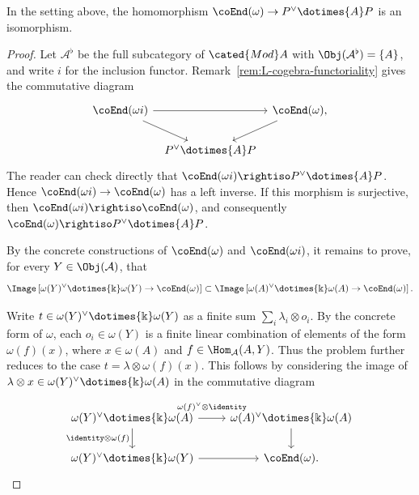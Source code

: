 \begin{proposition}\label{prop:endomorphism-vs-P}
	In the setting above, the homomorphism
	$\coEnd(\omega)\to P^\vee\dotimes{A}P$ is an isomorphism.
\end{proposition}
\begin{proof}
	Let $\mathcal{A}^\flat$ be the full subcategory of $\cated{Mod}A$ with
	$\Obj(\mathcal{A}^\flat)=\{A\}$, and write $i$ for the inclusion functor.
	Remark~\ref{rem:L-cogebra-functoriality} gives the commutative diagram
	\[\begin{tikzcd}[column sep=tiny]
		\coEnd(\omega i) \arrow[rr] \arrow[rd] & & \coEnd(\omega), \arrow[ld] \\
		& P^\vee \dotimes{A} P &
	\end{tikzcd}\]
	The reader can check directly that
	$\coEnd(\omega i)\rightiso P^\vee\dotimes{A}P$. Hence
	$\coEnd(\omega i)\to\coEnd(\omega)$ has a left inverse. If this morphism
	is surjective, then $\coEnd(\omega i)\rightiso\coEnd(\omega)$, and
	consequently $\coEnd(\omega)\rightiso P^\vee\dotimes{A}P$.

	By the concrete constructions of $\coEnd(\omega)$ and
	$\coEnd(\omega i)$, it remains to prove, for every
	$Y\in\Obj(\mathcal{A})$, that
	\[ \Image\left[ \omega(Y)^\vee \dotimes{\Bbbk} \omega(Y) \to \coEnd(\omega) \right] \subset \Image\left[ \omega(A)^\vee \dotimes{\Bbbk} \omega(A) \to \coEnd(\omega) \right]. \]

	Write $t\in\omega(Y)^\vee\dotimes{\Bbbk}\omega(Y)$ as a finite sum
	$\sum_i\lambda_i\otimes o_i$. By the concrete form of $\omega$, each
	$o_i\in\omega(Y)$ is a finite linear combination of elements of the form
	$\omega(f)(x)$, where $x\in\omega(A)$ and
	$f\in\Hom_{\mathcal{A}}(A,Y)$. Thus the problem further reduces to the
	case $t=\lambda\otimes\omega(f)(x)$. This follows by considering the image
	of $\lambda\otimes x\in\omega(Y)^\vee\dotimes{\Bbbk}\omega(A)$ in the
	commutative diagram
	\[\begin{tikzcd}
		\omega(Y)^\vee \dotimes{\Bbbk} \omega(A) \arrow[r, "{\omega(f)^\vee \otimes \identity}" inner sep=0.6em] \arrow[d, "{\identity \otimes \omega(f)}"'] & \omega(A)^\vee \dotimes{\Bbbk} \omega(A) \arrow[d] \\
		\omega(Y)^\vee \dotimes{\Bbbk}  \omega(Y) \arrow[r] & \coEnd(\omega).
	\end{tikzcd}\]
\end{proof}

